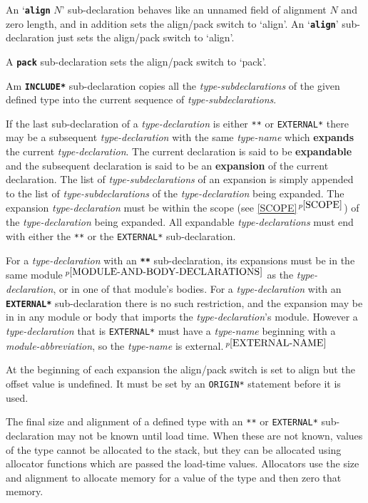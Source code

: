 \documentclass[12pt]{article}
\newcommand{\key}[1]{{\rm \bfseries #1}}
\newcommand{\ttkey}[1]{{\tt \bfseries #1}}
\newcommand{\skey}[2]{{\rm \bfseries #1#2}}
\newcommand{\itemref}[1]{\ref{#1}$\,^{p\pageref{#1}}$}
\newcommand{\pagnote}[1]{$\,^{p\pageref{#1}}$}
\begin{document}
An `\ttkey{align} $N$' sub-declaration behaves like an unnamed
field of alignment $N$ and zero length,
and in addition sets the align/pack switch to `align'.
An `\ttkey{align}' sub-declaration just sets the
align/pack switch to `align'.

A \ttkey{pack} sub-declaration sets the align/pack switch to `pack'.

Am \ttkey{*INCLUDE*} sub-declaration copies all the {\em type-subdeclarations}
of the given defined type into the current sequence of
{\em type-subdeclarations}.

If the last sub-declaration of a {\em type-declaration}
is either {\tt ***}\label{***} or {\tt *EXTERNAL*}\label{*EXTERNAL*}
there may be a subsequent {\em type-declaration} with the same
{\em type-name} which \skey{expand}s the current {\em type-declaration}.
The current declaration is said to be \key{expandable} and
the subsequent declaration is said to be an \key{expansion}
of the current declaration.
The list of {\em type-subdeclarations}\label{TYPE-DECLARATION-APPEND}
of an expansion is simply appended to the list of
{\em type-subdeclarations} of the {\em type-declaration} being expanded.
The expansion {\em type-declaration}
must be within the scope (see \itemref{SCOPE}) of the {\em type-declaration}
being expanded.   All expandable {\em type-declarations} must end with
either the {\tt ***} or the {\tt *EXTERNAL*} sub-declaration.

For a {\em type-declaration} with an \ttkey{***} sub-declaration,
its expansions must be in the same module\pagnote{MODULE-AND-BODY-DECLARATIONS}
as the {\em type-declaration}, or in one of that module's bodies.
For a {\em type-declaration} with an \ttkey{*EXTERNAL*} sub-declaration
there is no such restriction, and the expansion may be in
in any module or body that imports the {\em type-declaration}'s
module.  However a {\em type-declaration} that is {\tt *EXTERNAL*}
must have a {\em type-name} beginning with a {\em module-abbreviation}, so
the {\em type-name} is external.\pagnote{EXTERNAL-NAME}

At the beginning of each expansion the align/pack switch is set to align
but the offset value is undefined.  It must be set by an {\tt *ORIGIN*}
statement before it is used.

The final size and alignment of a defined type with an {\tt ***}
or {\tt *EXTERNAL*}
sub-declara\-tion may not be known until load time.  When these are not known,
values of the type cannot be allocated to the stack, but
they can be allocated using allocator functions which are passed
the load-time values.
Allocators use the size and alignment to allocate memory for a value of
the type and then zero that memory.
\end{document}
